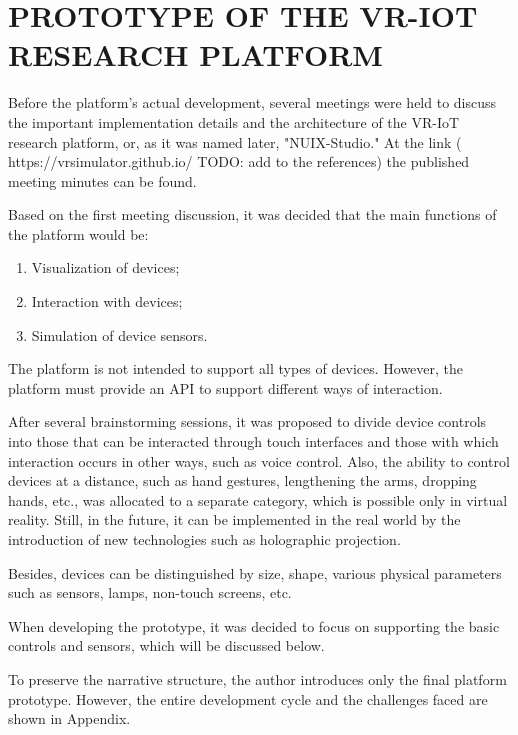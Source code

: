 
\chapter{PROTOTYPE OF THE VR-IOT RESEARCH PLATFORM}

Before the platform's actual development, several meetings were held to discuss the important implementation details and the architecture of the VR-IoT research platform, or, as it was named later, "NUIX-Studio." At the link ( https://vrsimulator.github.io/ TODO: add to the references)  the published meeting minutes can be found. 

Based on the first meeting discussion, it was decided that the main functions of the platform would be:
\begin{enumerate}
     \item Visualization of devices;
     \item Interaction with devices;
     \item Simulation of device sensors.
\end{enumerate}

The platform is not intended to support all types of devices. However, the platform must provide an API to support different ways of interaction.

After several brainstorming sessions, it was proposed to divide device controls into those that can be interacted through touch interfaces and those with which interaction occurs in other ways, such as voice control. Also, the ability to control devices at a distance, such as hand gestures, lengthening the arms, dropping hands, etc., was allocated to a separate category, which is possible only in virtual reality. Still, in the future, it can be implemented in the real world by the introduction of new technologies such as holographic projection.

Besides, devices can be distinguished by size, shape, various physical parameters such as sensors, lamps, non-touch screens, etc.

When developing the prototype, it was decided to focus on supporting the basic controls and sensors, which will be discussed below.

To preserve the narrative structure, the author introduces only the final platform prototype. However, the entire development cycle and the challenges faced are shown in Appendix.

